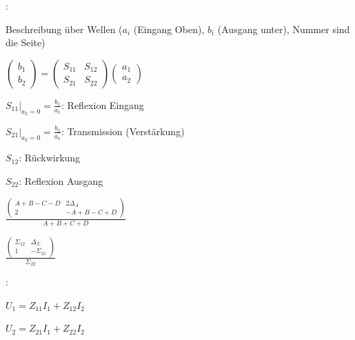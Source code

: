 \begin{pitemize}
    \item {}:
    \begin{pitemize}
        \item Beschreibung über Wellen ($a_i$ (Eingang Oben), $b_i$ (Ausgang unter), Nummer sind die Seite)
        \item $\begin{pmatrix} b_1 \\ b_2 \end{pmatrix}
                =
                \begin{pmatrix} S_{11} & S_{12} \\ S_{21} & S_{22} \end{pmatrix}
                \begin{pmatrix} a_1 \\ a_2 \end{pmatrix}$
            \begin{pitemize}
                \item $S_{11} \big|_{a_2 = 0} = \frac{b_1}{a_1}$: Reflexion Eingang
                \item $S_{21} \big|_{a_2 = 0} = \frac{b_2}{a_1}$: Transmission (Verstärkung)
                \item $S_{12}$: Rückwirkung
                \item $S_{22}$: Reflexion Ausgang
            \end{pitemize}
        \item $\frac{\begin{pmatrix}
            A + B - C - D & 2\Delta_A \\
            2  & -A + B - C +D
        \end{pmatrix}}{A+B+C+D}$
        \item $\frac{\begin{pmatrix}
            \Sigma_{12} & \Delta_\Sigma \\
            1  & -\Sigma_{21}
        \end{pmatrix}}{\Sigma_{22}}$
        \item {}
    \end{pitemize}

    \item {}:
    \begin{pitemize}
        \item $U_1 = Z_{11}I_1 + Z_{12}I_2$
        \item $U_2 = Z_{21}I_1 + Z_{22}I_2$
        \item {}
    \end{pitemize}


\end{pitemize}

